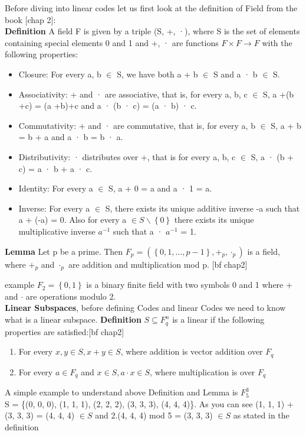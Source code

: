 Before diving into linear codes let us first look at the definition of Field from the book [chap 2]:\\
\textbf{Definition} A field F is given by a triple (S, +, ·), where S is the set of elements containing
special elements 0 and 1 and +, · are functions $F \times F \rightarrow F$ with the following properties:
\begin{itemize}\itemsep-\the\parsep
	\item Closure: For every a, b $\in$ S, we have both a + b $\in$ S and a · b $\in$ S.
	\item Associativity: + and · are associative, that is, for every a, b, c $\in$ S, a +(b +c) = (a +b)+c and a · (b · c) = (a · b) · c.
	\item Commutativity: + and · are commutative, that is, for every a, b $\in$ S, a + b = b + a and a · b = b · a.
	\item Distributivity: · distributes over +, that is for every a, b, c $\in$ S, a · (b + c) = a · b + a · c.
	\item Identity: For every a $\in$ S, a + 0 = a and a · 1 = a.
	\item Inverse: For every a $\in$ S, there exists its unique additive inverse -a such that a + (-a) = 0. Also for every a $\in S \backslash \left\{0\right\}$ there exists its unique multiplicative inverse $a^{-1}$ such that a · $a^{-1}$ = 1.
\end{itemize}

\textbf{Lemma} Let p be a prime. Then $F_p = (\left\{0, 1, . . . , p - 1\right\}, +_p , \cdot_p )$ is a field, where $+_p$ and $\cdot_p$ are
addition and multiplication mod p. [bf chap2]

example $F_2 = \left\{0,1\right\}$ is a binary finite field with two symbols 0 and 1 where + and $\cdot$ are operations modulo 2.\\

\textbf{Linear Subspaces},  before defining Codes and linear Codes we need to know what is a linear subspace.
\textbf{Definition} $ S \subseteq F_q^n $ is a linear if the following properties are satisfied:[bf chap2]
\begin{enumerate}
	\item For every $x,y \in S, x+y \in S$, where addition is vector addition over $F_q$
	\item For every $a \in F_q$ and $x \in S, a\cdot x\in S$, where multiplication is over $F_q$
\end{enumerate}

A simple example to understand above Definition and Lemma is $F_5^3$\\
S = \{(0, 0, 0), (1, 1, 1), (2, 2, 2), (3, 3, 3), (4, 4, 4)\}.
As you can see (1, 1, 1) + (3, 3, 3) = (4, 4, 4) $\in S$ and 2.(4, 4, 4) mod 5 = (3, 3, 3) $\in S$ as stated in the definition

